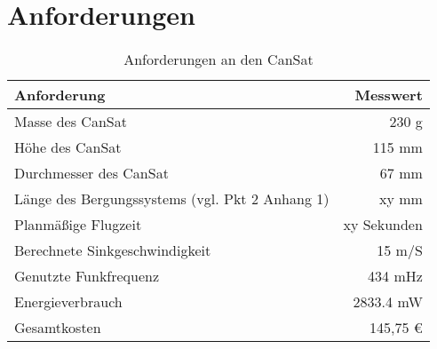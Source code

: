 \section{Anforderungen}
\begin{table}[htbp]
  \centering
  
    \begin{tabular}{l|r}
    \toprule
    \textbf{Anforderung} & \textbf{Messwert}  \\
    \midrule
    Masse des CanSat  & 230 g \\
    Höhe des CanSat	  & 115 mm\\
    Durchmesser des CanSat & 67 mm\\
	Länge des Bergungssystems (vgl. Pkt 2 Anhang 1)  & xy mm \\
	Planmäßige Flugzeit  & xy Sekunden \\
    Berechnete Sinkgeschwindigkeit  & 15 m/S \\
    Genutzte Funkfrequenz & 434 mHz \\
    Energieverbrauch & 2833.4 mW \\
    Gesamtkosten & 145,75 \euro \\
    \bottomrule
    \end{tabular}%
    \caption{Anforderungen an den CanSat}
  \label{tab:anforderungen}%
\end{table}%